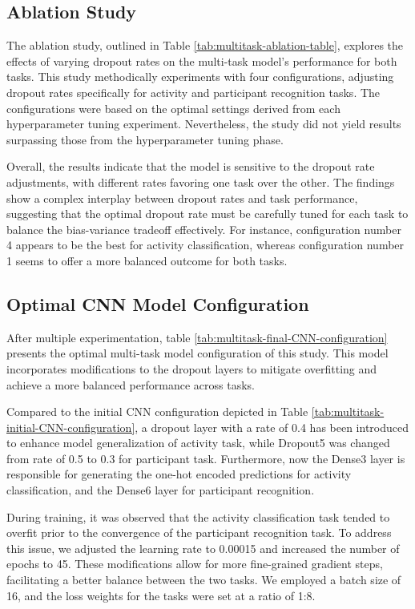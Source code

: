 \documentclass{l4proj}
\begin{document}
\subsection{Ablation Study}
The ablation study, outlined in Table \ref{tab:multitask-ablation-table}, explores the effects of varying dropout rates on the multi-task model's performance for both tasks. This study methodically experiments with four configurations, adjusting dropout rates specifically for activity and participant recognition tasks. The configurations were based on the optimal settings derived from each hyperparameter tuning experiment. Nevertheless, the study did not yield results surpassing those from the hyperparameter tuning phase.

Overall, the results indicate that the model is sensitive to the dropout rate adjustments, with different rates favoring one task over the other. The findings show a complex interplay between dropout rates and task performance, suggesting that the optimal dropout rate must be carefully tuned for each task to balance the bias-variance tradeoff effectively. For instance, configuration number 4 appears to be the best for activity classification, whereas configuration number 1 seems to offer a more balanced outcome for both tasks.

\subsection{Optimal CNN Model Configuration}
After multiple experimentation, table \ref{tab:multitask-final-CNN-configuration} presents the optimal multi-task model configuration of this study. This model incorporates modifications to the dropout layers to mitigate overfitting and achieve a more balanced performance across tasks.

Compared to the initial CNN configuration depicted in Table \ref{tab:multitask-initial-CNN-configuration}, a dropout layer with a rate of 0.4 has been introduced to enhance model generalization of activity task, while Dropout5 was changed from rate of 0.5 to 0.3 for participant task. Furthermore, now the Dense3 layer is responsible for generating the one-hot encoded predictions for activity classification, and the Dense6 layer for participant recognition.

During training, it was observed that the activity classification task tended to overfit prior to the convergence of the participant recognition task. To address this issue, we adjusted the learning rate to 0.00015 and increased the number of epochs to 45. These modifications allow for more fine-grained gradient steps, facilitating a better balance between the two tasks. We employed a batch size of 16, and the loss weights for the tasks were set at a ratio of 1:8.
\end{document}
